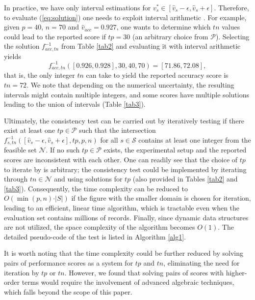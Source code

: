 \documentclass[3p, times]{elsarticle}
\begin{document}
In practice, we have only interval estimations for $v_s^* \in [\hat{v}_s - \epsilon, \hat{v}_s + \epsilon]$. Therefore, to evaluate (\ref{eq:solution}) one needs to exploit interval arithmetic \cite{interval}. For example, given $p=40$, $n=70$ and $\hat{v}_{acc} = 0.927$, one wants to determine which $tn$ values could lead to the reported score if $tp=30$ (an arbitrary choice from $\mathcal{P}$). Selecting the solution $f^{-1}_{acc, tn}$ from Table \ref{tab2} and evaluating it with interval arithmetic yields
\begin{equation}
f^{-1}_{acc, tn}([0.926, 0.928], 30, 40, 70) = [71.86, 72.08],
\end{equation}
that is, the only integer $tn$ can take to yield the reported accuracy score is $tn=72$. We note that depending on the numerical uncertainty, the resulting intervals might contain multiple integers, and some scores have multiple solutions leading to the union of intervals (Table \ref{tab3}).

Ultimately, the consistency test can be carried out by iteratively testing if there exist at least one $tp\in\mathcal{P}$ such that the intersection $f_{s, tn}^{-1}([\hat{v}_s - \epsilon, \hat{v}_s + \epsilon], tp, p, n)$ for all $s\in\mathcal{S}$ contains at least one integer from the feasible set $\mathcal{N}$. If no such $tp\in\mathcal{P}$ exists, the experimental setup and the reported scores are inconsistent with each other. 
One can readily see that the choice of $tp$ to iterate by is arbitrary; the consistency test could be implemented by iterating through $tn\in\mathcal{N}$ and using solutions for $tp$ (also provided in Tables \ref{tab2} and \ref{tab3}). Consequently, the time complexity can be reduced to $O(\min(p, n)\cdot \vert S\vert)$ if the figure with the smaller domain is chosen for iteration, leading to an efficient, linear time algorithm, which is tractable even when the evaluation set contains millions of records. Finally, since dynamic data structures are not utilized, the space complexity of the algorithm becomes $O(1)$. The detailed pseudo-code of the test is listed in Algorithm \ref{alg1}. 

It is worth noting that the time complexity could be further reduced by solving pairs of performance scores as a system for $tp$ and $tn$, eliminating the need for iteration by $tp$ or $tn$. However, we found that solving pairs of scores with higher-order terms would require the involvement of advanced algebraic techniques, which falls beyond the scope of this paper.
\end{document}
